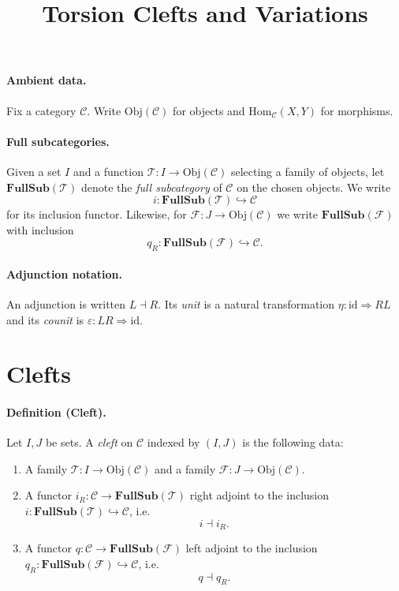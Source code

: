\documentclass[11pt]{article}
\newcommand{\Obj}{\mathrm{Obj}}
\newcommand{\Hom}{\mathrm{Hom}}
\newcommand{\id}{\mathrm{id}}
\newcommand{\FS}[1]{\mathbf{FullSub}(#1)} %
\begin{document}
\title{Torsion Clefts and Variations}
\date{}
\maketitle

\paragraph{Ambient data.}
Fix a category $\mathcal{C}$. Write $\Obj(\mathcal{C})$ for objects and $\Hom_{\mathcal{C}}(X,Y)$ for morphisms.

\paragraph{Full subcategories.}
Given a set $I$ and a function $\mathcal{T} : I \to \Obj(\mathcal{C})$ selecting a family of objects, let
$\FS{\mathcal{T}}$ denote the \emph{full subcategory} of $\mathcal{C}$ on the chosen objects.
We write
\[
  i : \FS{\mathcal{T}} \hookrightarrow \mathcal{C}
\]
for its inclusion functor.
Likewise, for $\mathcal{F} : J \to \Obj(\mathcal{C})$ we write $\FS{\mathcal{F}}$ with inclusion
\[
  q_R : \FS{\mathcal{F}} \hookrightarrow \mathcal{C}.
\]

\paragraph{Adjunction notation.}
An adjunction is written $L \dashv R$.
Its \emph{unit} is a natural transformation $\eta : \id \Rightarrow R L$ and its \emph{counit} is
$\varepsilon : L R \Rightarrow \id$.

\section*{Clefts}

\paragraph{Definition (Cleft).}
Let $I,J$ be sets.
A \emph{cleft} on $\mathcal{C}$ indexed by $(I,J)$ is the following data:

\begin{enumerate}
\item A family $\mathcal{T} : I \to \Obj(\mathcal{C})$ and a family $\mathcal{F} : J \to \Obj(\mathcal{C})$.
\item A functor $i_R : \mathcal{C} \to \FS{\mathcal{T}}$ right adjoint to the inclusion
      $i : \FS{\mathcal{T}} \hookrightarrow \mathcal{C}$, i.e.
      \[ i \dashv i_R. \]
\item A functor $q : \mathcal{C} \to \FS{\mathcal{F}}$ left adjoint to the inclusion
      $q_R : \FS{\mathcal{F}} \hookrightarrow \mathcal{C}$, i.e.
      \[ q \dashv q_R. \]
\end{enumerate}
\end{document}
